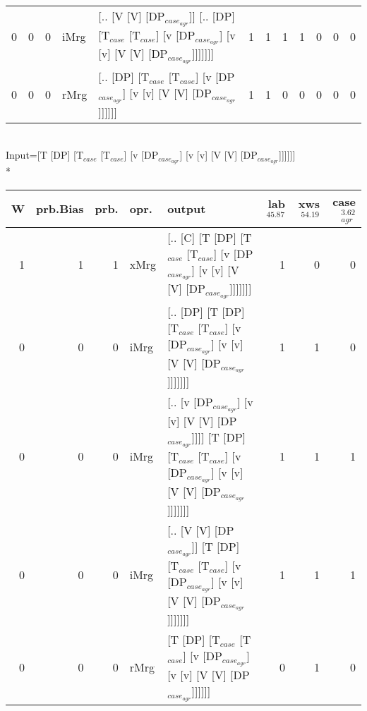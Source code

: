 \begin{tabularx}{\linewidth}{rrrlXrrrrrrr}
   0 &       0 &   0 & iMrg & [.. [V [V] [DP$_{case_{agr}}$]] [.. [DP] [T$_{case}$ [T$_{case}$] [v [DP$_{case_{agr}}$] [v [v] [V [V] [DP$_{case_{agr}}$]]]]]]]                                             &             1 &             1 &                  1 &            1 &              0 &                0 &              0 \\
   0 &       0 &   0 & rMrg & [.. [DP] [T$_{case}$ [T$_{case}$] [v [DP$_{case_{agr}}$] [v [v] [V [V] [DP$_{case_{agr}}$]]]]]]                                                                        &             1 &             1 &                  0 &            0 &              0 &                0 &              0 \\
\hline
\end{tabularx}\endgroup\\
\begingroup\scriptsize Input=[T [DP] [T$_{case}$ [T$_{case}$] [v [DP$_{case_{agr}}$] [v [v] [V [V] [DP$_{case_{agr}}$]]]]]]\\*
\begin{tabularx}{\linewidth}{rrrlXrrr}
\hline
   W &   prb.Bias &   prb. & opr.   & output                                                                                                                          &   lab$^{45.87}$ &   xws$^{54.19}$ &   case$_{agr}^{3.62}$ \\
\hline
   1 &       1 &   1 & xMrg & [.. [C] [T [DP] [T$_{case}$ [T$_{case}$] [v [DP$_{case_{agr}}$] [v [v] [V [V] [DP$_{case_{agr}}$]]]]]]]                                             &             1 &             0 &                  0 \\
   0 &       0 &   0 & iMrg & [.. [DP] [T [DP] [T$_{case}$ [T$_{case}$] [v [DP$_{case_{agr}}$] [v [v] [V [V] [DP$_{case_{agr}}$]]]]]]]                                            &             1 &             1 &                  0 \\
   0 &       0 &   0 & iMrg & [.. [v [DP$_{case_{agr}}$] [v [v] [V [V] [DP$_{case_{agr}}$]]]] [T [DP] [T$_{case}$ [T$_{case}$] [v [DP$_{case_{agr}}$] [v [v] [V [V] [DP$_{case_{agr}}$]]]]]]] &             1 &             1 &                  1 \\
   0 &       0 &   0 & iMrg & [.. [V [V] [DP$_{case_{agr}}$]] [T [DP] [T$_{case}$ [T$_{case}$] [v [DP$_{case_{agr}}$] [v [v] [V [V] [DP$_{case_{agr}}$]]]]]]]                           &             1 &             1 &                  1 \\
   0 &       0 &   0 & rMrg & [T [DP] [T$_{case}$ [T$_{case}$] [v [DP$_{case_{agr}}$] [v [v] [V [V] [DP$_{case_{agr}}$]]]]]]                                                      &             0 &             1 &                  0 \\
\hline
\end{tabularx}\endgroup\\
